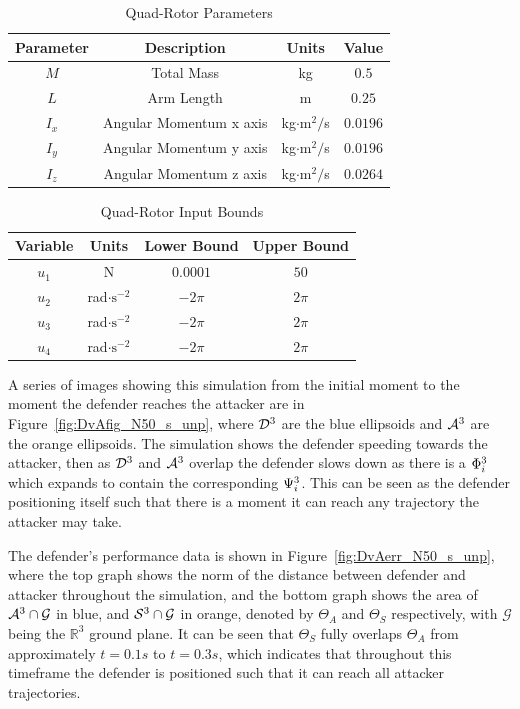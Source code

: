 \documentclass[letterpaper,10pt,conference]{ieeeconf}
\begin{document}
\begin{table}[!t]
\renewcommand{\arraystretch}{1.3}
\caption{Quad-Rotor Parameters}
\label{tab:quadrotor_parameters}
\centering
\begin{tabular}{c||c||c||c}
\hline
\bfseries Parameter & \bfseries Description & \bfseries Units & \bfseries Value\\
\hline\hline
$M$ & Total Mass & kg & $0.5$\\
\hline
$L$ & Arm Length & m & $0.25$ \\
\hline
$I_x$ & Angular Momentum x axis & kg$\cdot \text{m}^2/$s & $0.0196$\\
\hline
$I_y$ & Angular Momentum y axis & kg$\cdot \text{m}^2/$s & $0.0196$\\
\hline
$I_z$ & Angular Momentum z axis & kg$\cdot \text{m}^2/$s & $0.0264$\\
\hline
\end{tabular}
\end{table}

\begin{table}[!t]
\renewcommand{\arraystretch}{1.3}
\caption{Quad-Rotor Input Bounds}
\label{tab:quadrotor_variable_bounds}
\centering
\begin{tabular}{c||c||c||c}
\hline
\bfseries Variable & \bfseries Units & \bfseries Lower Bound & \bfseries Upper Bound\\
\hline\hline
$u_1$ & N & $0.0001$ & $50$\\
\hline
$u_2$ & rad$\cdot \text{s}^{-2}$ & $-2 \pi$ & $2 \pi$ \\
\hline
$u_3$ & rad$\cdot \text{s}^{-2}$ & $-2 \pi$ & $2 \pi$ \\
\hline
$u_4$ & rad$\cdot \text{s}^{-2}$ & $-2 \pi$ & $2 \pi$ \\
\hline
\end{tabular}
\end{table}

A series of images showing this simulation from the initial moment to the moment the defender reaches the attacker are in Figure~\ref{fig:DvAfig_N50_s_unp}, where $\mathcal{D}^3$ are the blue ellipsoids and $\mathcal{A}^3$ are the orange ellipsoids. The simulation shows the defender speeding towards the attacker, then as $\mathcal{D}^3$ and $\mathcal{A}^3$ overlap the defender slows down as there is a $\Phi^3_i$ which expands to contain the corresponding $\Psi^3_i$. This can be seen as the defender positioning itself such that there is a moment it can reach any trajectory the attacker may take.

The defender's performance data is shown in Figure~\ref{fig:DvAerr_N50_s_unp}, where the top graph shows the norm of the distance between defender and attacker throughout the simulation, and the bottom graph shows the area of $\mathcal{A}^3 \cap \mathcal{G}$ in blue, and $\mathcal{S}^3 \cap \mathcal{G}$ in orange, denoted by $\Theta_A$ and $\Theta_S$ respectively, with $\mathcal{G}$ being the $\mathbb{R}^3$ ground plane. It can be seen that $\Theta_S$ fully overlaps $\Theta_A$ from approximately $t=0.1s$ to $t=0.3s$, which indicates that throughout this timeframe the defender is positioned such that it can reach all attacker trajectories.
\end{document}
